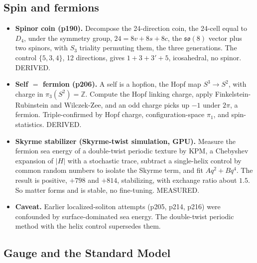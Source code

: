 \subsection{Spin and fermions}

\begin{itemize}
  \item \textbf{Spinor coin (p190).} Decompose the 24-direction coin, the 24-cell equal to $D_4$, under the
  symmetry group, $24 = 8v + 8s + 8c$, the $\mathfrak{so}(8)$ vector plus two spinors, with $S_3$ triality
  permuting them, the three generations. The control $\{5,3,4\}$, 12 directions, gives $1 + 3 + 3' + 5$,
  icosahedral, no spinor. DERIVED.
  \item \textbf{Self $=$ fermion (p206).} A self is a hopfion, the Hopf map $S^3 \to S^2$, with charge in
  $\pi_3(S^2) = \mathbb{Z}$. Compute the Hopf linking charge, apply Finkelstein-Rubinstein and Wilczek-Zee, and an
  odd charge picks up $-1$ under $2\pi$, a fermion. Triple-confirmed by Hopf charge, configuration-space $\pi_1$,
  and spin-statistics. DERIVED.
  \item \textbf{Skyrme stabilizer (Skyrme-twist simulation, GPU).} Measure the fermion sea energy of a
  double-twist periodic texture by KPM, a Chebyshev expansion of $|H|$ with a stochastic trace, subtract a
  single-helix control by common random numbers to isolate the Skyrme term, and fit $A q^2 + B q^4$. The result is
  positive, $+798$ and $+814$, stabilizing, with exchange ratio about $1.5$. So matter forms and is stable, no
  fine-tuning. MEASURED.
  \item \textbf{Caveat.} Earlier localized-soliton attempts (p205, p214, p216) were confounded by
  surface-dominated sea energy. The double-twist periodic method with the helix control supersedes them.
\end{itemize}

\subsection{Gauge and the Standard Model}

